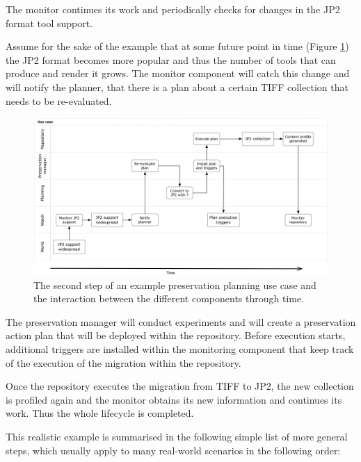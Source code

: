 The monitor continues its work and periodically checks for changes in the JP2 format tool support.

Assume for the sake of the example that at some future point in time (Figure \ref{fig:swimlane_step2}) the JP2 format becomes more popular and thus the number of tools that can produce and render it grows. The monitor component will catch this change and will notify the planner, that there is a plan about a certain TIFF collection that needs to be re-evaluated.

\begin{figure}[th]
\begin{center}
\includegraphics[width=6in]{figures/related/swimlane_step2.png}
\caption{The second step of an example preservation planning use case and the interaction between the different components through time.}
\label{fig:swimlane_step2}
\end{center}
\end{figure}

The preservation manager will conduct experiments and will create a preservation action plan that will be deployed within the repository. Before execution starts, additional triggers are installed within the monitoring component that keep track of the execution of the migration within the repository.

Once the repository executes the migration from TIFF to JP2, the new collection is profiled again and the monitor obtains its new information and continues its work. Thus the whole lifecycle is completed.

This realistic example is summarised in the following simple list of more general steps, which usually apply to many real-world scenarios in the following order:


